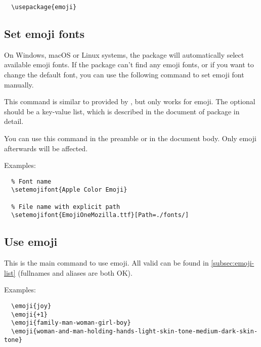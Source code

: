 \documentclass{l3doc}
\newcounter { emoji }
\begin{document}
\begin{verbatim}
  \usepackage{emoji}
\end{verbatim}

\subsection{ Set emoji fonts}

On Windows, macOS or Linux systems, the  package will automatically select available
emoji fonts. If the package can't find any emoji fonts, or if you want to change the default font,
you can use the following command to set emoji font manually.

\begin{function}{\setemojifont}
  \begin{syntax}
  \end{syntax}
  This command is similar to  provided by , but only works for
  emoji. The optional  should be a key-value list, which is described in the
  document of  package in detail.

  You can use this command in the preamble or in the document body. Only emoji afterwards will
  be affected.
\end{function}

Examples:

\begin{verbatim}
  % Font name
  \setemojifont{Apple Color Emoji}

  % File name with explicit path
  \setemojifont{EmojiOneMozilla.ttf}[Path=./fonts/]
\end{verbatim}

\subsection{ Use emoji}

\begin{function}{\emoji}
  \begin{syntax}
  \end{syntax}
  This is the main command to use emoji. All valid  can be found in
  \autoref{subsec:emoji-list} (fullnames and aliases are both OK).
\end{function}

Examples:

\begin{verbatim}
  \emoji{joy}
  \emoji{+1}
  \emoji{family-man-woman-girl-boy}
  \emoji{woman-and-man-holding-hands-light-skin-tone-medium-dark-skin-tone}
\end{verbatim}
\end{document}
